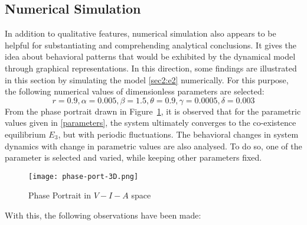 \documentclass[12pt,a4wide]{report}
\numberwithin{equation}{chapter}
\numberwithin{theorem}{chapter}
\begin{document}
\subsection{Numerical Simulation}
In addition to qualitative features, numerical simulation also appears to be helpful for substantiating and comprehending analytical conclusions. It gives the idea about behavioral patterns that would be exhibited by the dynamical model through graphical representations. In this direction, some findings are illustrated in this section by simulating the model \eqref{sec2:e2} numerically. For this purpose, the following numerical values of dimensionless parameters are selected:
\begin{equation}\label{parameters}
r = 0.9, \alpha=0.005, \beta=1.5, \theta=0.9, \gamma=0.0005, \delta=0.003
\end{equation}
From the phase portrait drawn in Figure~\ref{fig:rip-inv-agr}, it is observed that for the parametric values given in \eqref{parameters}, the system ultimately converges to the co-existence equilibrium $E_3$, but with periodic fluctuations. The behavioral changes in system dynamics with change in parametric values are also analysed. To do so, one of the parameter is selected and varied, while keeping other parameters fixed.
\begin{figure}[hbt!]
                 \centering
         \texttt{[image: phase-port-3D.png]}
		\caption{Phase Portrait in $V-I-A$ space} \label{fig:rip-inv-agr}
	\end{figure}
With this, the following observations have been made:
\end{document}
